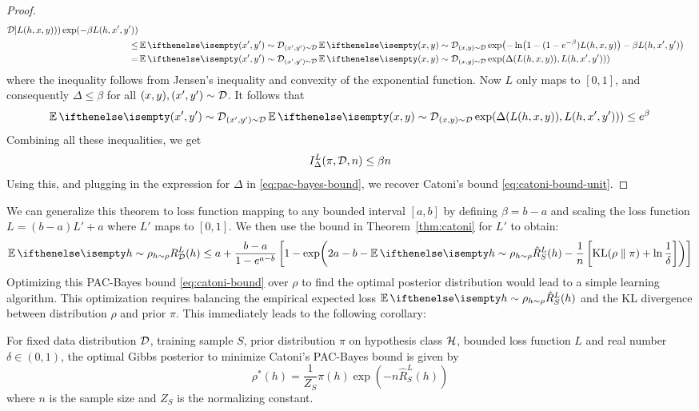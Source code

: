\begin{proof}
\begin{equation}
\begin{split}
{      \CD]{L(h, x, y)})) \exp(-\beta L(h, x', y'))} \\
      \leq& \Ev[(x', y') \sim \CD]{\Ev[(x, y) \sim \CD]{\exp(- \ln(1 - (1 -
      e^{-\beta}) L(h, x, y)) - \beta L(h, x', y'))}} \\
      =& \Ev[(x', y') \sim \CD]{\Ev[(x, y) \sim \CD]{\exp(\Delta(L(h, x, y)),
      L(h, x', y')))}}
    \end{split}
  \end{equation}
  where the inequality follows from Jensen's inequality and convexity of the
  exponential function. Now $L$ only maps to $[0, 1]$, and consequently $\Delta
  \leq \beta$ for all $(x, y), (x', y') \sim \mathcal{D}$. It follows that
  \begin{equation}
    \Ev[(x', y') \sim \CD]{\Ev[(x, y) \sim \CD]{\exp(\Delta(L(h, x, y)), L(h,
    x', y')))}} \leq e^\beta
  \end{equation}
  Combining all these inequalities, we get
  \begin{equation}
    I_\Delta^L(\pi, \mathcal{D}, n) \leq \beta n
  \end{equation}
  Using this, and plugging in the expression for $\Delta$ in
  \eqref{eq:pac-bayes-bound}, we recover Catoni's bound
  \eqref{eq:catoni-bound-unit}.
\end{proof}

We can generalize this theorem to loss function mapping to any bounded interval
$[a, b]$ by defining $\beta = b - a$ and scaling the loss function $L = (b - a)
L' + a$ where $L'$ maps to $[0, 1]$. We then use the bound in
Theorem~\ref{thm:catoni} for $L'$ to obtain:
\begin{equation}
  \label{eq:catoni-bound}
  \Ev[h \sim \rho]{R_\CD^L(h)} \leq a + \frac{b - a}{1 - e^{a - b}} \left[1 -
  \exp(2 a - b - \Ev[h \sim \rho]{\hat{R}_S^L(h)} - \frac{1}{n}
  \left[\KL{\rho}{\pi} + \ln \frac{1}{\delta}\right])\right]
\end{equation}
Optimizing this PAC-Bayes bound \eqref{eq:catoni-bound} over $\rho$ to find the
optimal posterior distribution would lead to a simple learning algorithm.  This
optimization requires balancing the empirical expected loss $\Ev[h \sim
\rho]{\hat{R}_S^L(h)}$ and the KL divergence between distribution $\rho$ and
prior $\pi$. This immediately leads to the following corollary:

\begin{corollary}
  \label{cor:gibbs}
  For fixed data distribution $\mathcal{D}$, training sample $S$, prior distribution
  $\pi$ on hypothesis class $\mathcal{H}$, bounded loss function $L$ and real number
  $\delta \in (0, 1)$, the optimal Gibbs posterior to minimize Catoni's
  PAC-Bayes bound is given by
  \begin{equation}
    \rho^*(h) = \frac{1}{Z_S} \pi(h) \exp(-n \hat{R}_S^L(h))
  \end{equation}
  where $n$ is the sample size and $Z_S$ is the normalizing constant.
\end{corollary}

